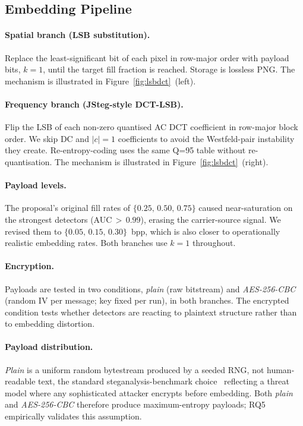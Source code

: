 \documentclass[10pt,twocolumn,a4paper]{article}
\begin{document}
\subsection{Embedding Pipeline}
\label{sec:embedding}

\paragraph{Spatial branch (LSB substitution).} Replace the least-significant bit of each pixel in row-major order with payload bits, $k\!=\!1$, until the target fill fraction is reached. Storage is lossless PNG. The mechanism is illustrated in Figure~\ref{fig:lsbdct}~(left).

\paragraph{Frequency branch (JSteg-style DCT-LSB).} Flip the LSB of each non-zero quantised AC DCT coefficient in row-major block order. We skip DC and $|c|\!=\!1$ coefficients to avoid the Westfeld-pair instability they create. Re-entropy-coding uses the same Q=95 table without re-quantisation. The mechanism is illustrated in Figure~\ref{fig:lsbdct}~(right).

\paragraph{Payload levels.} The proposal's original fill rates of $\{0.25,\,0.50,\,0.75\}$ caused near-saturation on the strongest detectors (AUC$\,>\,0.99$), erasing the carrier-source signal. We revised them to $\{0.05,\,0.15,\,0.30\}$~bpp, which is also closer to operationally realistic embedding rates. Both branches use $k\!=\!1$ throughout.

\paragraph{Encryption.} Payloads are tested in two conditions, \emph{plain} (raw bitstream) and \emph{AES-256-CBC} (random IV per message; key fixed per run), in both branches. The encrypted condition tests whether detectors are reacting to plaintext structure rather than to embedding distortion.

\paragraph{Payload distribution.} \emph{Plain} is a uniform random bytestream produced by a seeded RNG, not human-readable text, the standard steganalysis-benchmark choice~\cite{boroumand2019srnet,holub2015dctr} reflecting a threat model where any sophisticated attacker encrypts before embedding. Both \emph{plain} and \emph{AES-256-CBC} therefore produce maximum-entropy payloads; RQ5 empirically validates this assumption.
\end{document}
